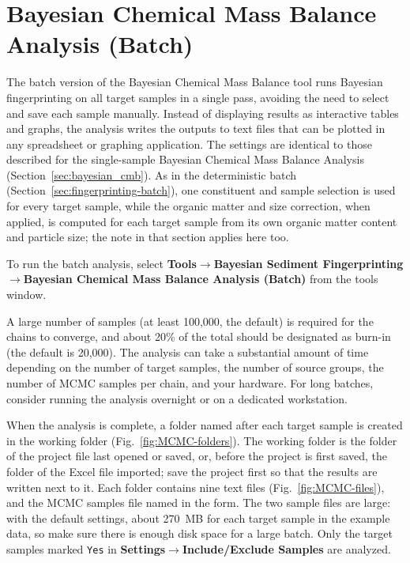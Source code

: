 \documentclass[12pt]{report}
\begin{document}
\section{Bayesian Chemical Mass Balance Analysis (Batch)}\label{sec:bayesian-batch}
The batch version of the Bayesian Chemical Mass Balance tool runs Bayesian fingerprinting on all target samples in a single pass, avoiding the need to select and save each sample manually. Instead of displaying results as interactive tables and graphs, the analysis writes the outputs to text files that can be plotted in any spreadsheet or graphing application. The settings are identical to those described for the single-sample Bayesian Chemical Mass Balance Analysis (Section~\ref{sec:bayesian_cmb}). As in the deterministic batch (Section~\ref{sec:fingerprinting-batch}), one constituent and sample selection is used for every target sample, while the organic matter and size correction, when applied, is computed for each target sample from its own organic matter content and particle size; the note in that section applies here too.

To run the batch analysis, select \textbf{Tools}$\rightarrow$\textbf{Bayesian Sediment Fingerprinting}$\rightarrow$\textbf{Bayesian Chemical Mass Balance Analysis (Batch)} from the tools window.

\begin{tcolorbox}[colback=yellow!10,colframe=yellow!50!black,title=Note]
A large number of samples (at least 100{,}000, the default) is required for the chains to converge, and about 20\% of the total should be designated as burn-in (the default is 20{,}000). The analysis can take a substantial amount of time depending on the number of target samples, the number of source groups, the number of MCMC samples per chain, and your hardware. For long batches, consider running the analysis overnight or on a dedicated workstation.
\end{tcolorbox}

When the analysis is complete, a folder named after each target sample is created in the working folder (Fig.~\ref{fig:MCMC-folders}). The working folder is the folder of the project file last opened or saved, or, before the project is first saved, the folder of the Excel file imported; save the project first so that the results are written next to it. Each folder contains nine text files (Fig.~\ref{fig:MCMC-files}), and the MCMC samples file named in the form. The two sample files are large: with the default settings, about 270~MB for each target sample in the example data, so make sure there is enough disk space for a large batch. Only the target samples marked \texttt{Yes} in \textbf{Settings}$\rightarrow$\textbf{Include/Exclude Samples} are analyzed.
\end{document}
